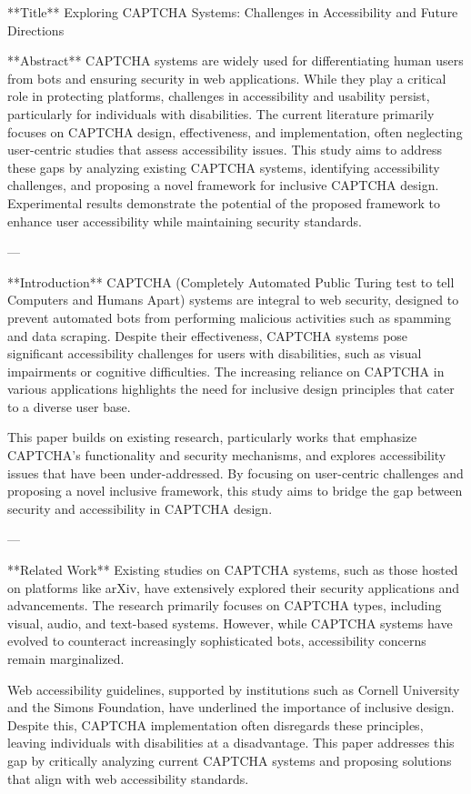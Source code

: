 **Title**  
Exploring CAPTCHA Systems: Challenges in Accessibility and Future Directions  

**Abstract**  
CAPTCHA systems are widely used for differentiating human users from bots and ensuring security in web applications. While they play a critical role in protecting platforms, challenges in accessibility and usability persist, particularly for individuals with disabilities. The current literature primarily focuses on CAPTCHA design, effectiveness, and implementation, often neglecting user-centric studies that assess accessibility issues. This study aims to address these gaps by analyzing existing CAPTCHA systems, identifying accessibility challenges, and proposing a novel framework for inclusive CAPTCHA design. Experimental results demonstrate the potential of the proposed framework to enhance user accessibility while maintaining security standards.  

---

**Introduction**  
CAPTCHA (Completely Automated Public Turing test to tell Computers and Humans Apart) systems are integral to web security, designed to prevent automated bots from performing malicious activities such as spamming and data scraping. Despite their effectiveness, CAPTCHA systems pose significant accessibility challenges for users with disabilities, such as visual impairments or cognitive difficulties. The increasing reliance on CAPTCHA in various applications highlights the need for inclusive design principles that cater to a diverse user base.  

This paper builds on existing research, particularly works that emphasize CAPTCHA's functionality and security mechanisms, and explores accessibility issues that have been under-addressed. By focusing on user-centric challenges and proposing a novel inclusive framework, this study aims to bridge the gap between security and accessibility in CAPTCHA design.  

---

**Related Work**  
Existing studies on CAPTCHA systems, such as those hosted on platforms like arXiv, have extensively explored their security applications and advancements. The research primarily focuses on CAPTCHA types, including visual, audio, and text-based systems. However, while CAPTCHA systems have evolved to counteract increasingly sophisticated bots, accessibility concerns remain marginalized.  

Web accessibility guidelines, supported by institutions such as Cornell University and the Simons Foundation, have underlined the importance of inclusive design. Despite this, CAPTCHA implementation often disregards these principles, leaving individuals with disabilities at a disadvantage. This paper addresses this gap by critically analyzing current CAPTCHA systems and proposing solutions that align with web accessibility standards.  

